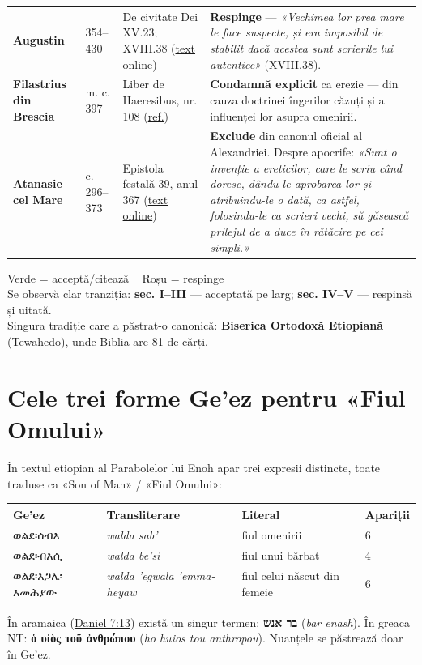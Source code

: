 \documentclass[12pt,a4paper,twoside,openany]{book}
\begin{document}
\begin{longtable}{L{0.8cm}L{0.8cm}L{3.1cm}L{10.0cm}}
\textbf{Augustin} & 354–430 & De civitate Dei XV.23; XVIII.38 (\href{https://www.newadvent.org/fathers/120115.htm}{text online}) & \textbf{Respinge} — \textit{«Vechimea lor prea mare le face suspecte, și era imposibil de stabilit dacă acestea sunt scrierile lui autentice»} (XVIII.38). \\
\textbf{Filastrius din Brescia} & m. c. 397 & Liber de Haeresibus, nr. 108 (\href{https://www.newadvent.org/cathen/06083a.htm}{ref.}) & \textbf{Condamnă explicit} ca erezie — din cauza doctrinei îngerilor căzuți și a influenței lor asupra omenirii. \\
\textbf{Atanasie cel Mare} & c. 296–373 & Epistola festală 39, anul 367 (\href{https://www.newadvent.org/fathers/2806039.htm}{text online}) & \textbf{Exclude} din canonul oficial al Alexandriei. Despre apocrife: \textit{«Sunt o invenție a ereticilor, care le scriu când doresc, dându-le aprobarea lor și atribuindu-le o dată, ca astfel, folosindu-le ca scrieri vechi, să găsească prilejul de a duce în rătăcire pe cei simpli.»} \\
\bottomrule
\end{longtable}
\normalsize
Verde = acceptă/citează   Roșu = respinge \\

Se observă clar tranziția: \textbf{sec. I–III} — acceptată pe larg; \textbf{sec. IV–V} — respinsă și uitată. \\

Singura tradiție care a păstrat-o canonică: \textbf{Biserica Ortodoxă Etiopiană} (Tewahedo), unde Biblia are 81 de cărți.


\chapter{Cele trei forme Ge’ez pentru «Fiul Omului»}\label{geez}
În textul etiopian al Parabolelor lui Enoh apar trei expresii distincte, toate traduse ca «Son of Man» / «Fiul Omului»:

\begin{center}
\small
\begin{tabular}{L{2.6cm}L{5.0cm}L{5.5cm}L{1.6cm}}
\toprule
{}
\textbf{Ge’ez} & \textbf{Transliterare} & \textbf{Literal} & \textbf{Apariții} \\
\midrule
{\geezfont ወልደ፡\allowbreak ሰብእ }& \textit{walda sab’} & fiul omenirii & 6 \\
{\geezfont ወልደ፡\allowbreak ብእሲ }& \textit{walda be’si} & fiul unui bărbat & 4 \\
{\geezfont ወልደ፡\allowbreak እጋሌ፡\allowbreak እመሕያው }& \textit{walda ’egwala ’emma-heyaw} & fiul celui născut din femeie & 6 \\
\bottomrule
\end{tabular}
\end{center}
\normalsize
În aramaica (\href{https://bibliaortodoxa.ro/carte.php?id=16\&cap=7\#13}{Daniel 7:13}) există un singur termen: \textbf{בר אנש} (\textit{bar enash}). În greaca NT: \textbf{ὁ υἱὸς τοῦ ἀνθρώπου} (\textit{ho huios tou anthropou}). Nuanțele se păstrează doar în Ge’ez.
\end{document}
